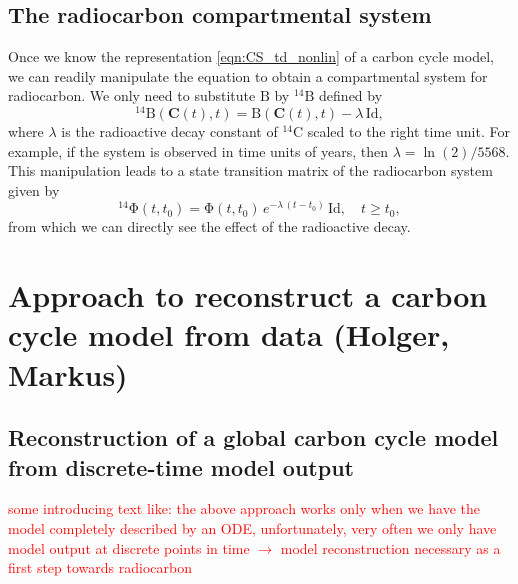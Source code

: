 \documentclass[11pt,a4paper]{article}
\newcommand{\red}[1]{\textcolor{red}{#1}}
\newcommand{\gray}[1]{\textcolor{gray}{#1}}
\renewcommand{\vec}[1]{\mathbf{#1}}
\newcommand{\tens}[1]{\mathrm{#1}}
\newcommand{\id}{\tens{Id}}
\begin{document}
\subsection*{The radiocarbon compartmental system}
    Once we know the representation \eqref{eqn:CS_td_nonlin} of a carbon cycle model, we can readily manipulate the equation to obtain a compartmental system for radiocarbon.
    We only need to substitute $\tens{B}$ by ${}^{14}\tens{B}$ defined by
    \begin{equation*}
        {}^{14}\tens{B}(\vec{C}(t),t) = \tens{B}(\vec{C}(t),t) - \lambda\,\id,
    \end{equation*}
    where $\lambda$ is the radioactive decay constant of ${}^{14}$C scaled to the right time unit.
    For example, if the system is observed in time units of years, then $\lambda=\ln(2)/5568$.
    This manipulation leads to a state transition matrix of the radiocarbon system given by
    \begin{equation*}
        {}^{14}\tens{\Phi}(t,t_0) = \tens{\Phi}(t,t_0)\, e^{-\lambda\,(t-t_0)}\,\id, \quad t\geq t_0,
    \end{equation*}
    from which we can directly see the effect of the radioactive decay.


\section*{Approach to reconstruct a carbon cycle model from data (Holger, Markus)}


\subsection*{Reconstruction of a global carbon cycle model from discrete-time model output}
    \red{some introducing text like: the above approach works only when we have the model completely described by an ODE, unfortunately, very often we only have model output at discrete points in time $\to$ model reconstruction necessary as a first step towards radiocarbon}
    
\end{document}
